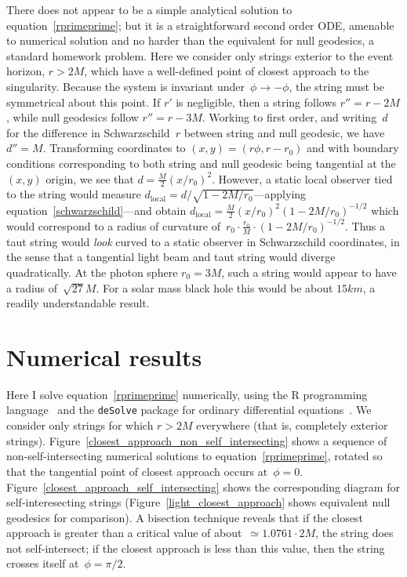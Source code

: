 \documentclass{ws-tpe}
\begin{document}
There does not appear to be a simple analytical solution to
equation~\ref{rprimeprime}; but it is a straightforward second order
ODE, amenable to numerical solution and no harder than the equivalent
for null geodesics, a standard homework problem.  Here we consider
only strings exterior to the event horizon, $r>2M$, which have a
well-defined point of closest approach to the singularity.  Because
the system is invariant under~$\phi\longrightarrow-\phi$, the string
must be symmetrical about this point.  If $r'$ is negligible, then a string
follows $r''=r-2M$, while null geodesics follow $r''=r-3M$.
Working to first order, and writing~$d$ for the difference in
Schwarzschild~$r$ between string and null geodesic, we have $d''=M$.
Transforming coordinates to $(x,y) = (r\phi,r-r_0)$ and with boundary
conditions corresponding to both string and null geodesic being
tangential at the $(x,y)$ origin, we see that
$d=\frac{M}{2}(x/r_0)^2$.  However, a static local observer tied to
the string would measure
$d_\mathrm{local}=d/\sqrt{1-2M/r_0}$---applying
equation~\ref{schwarzschild}---and obtain
$d_\mathrm{local}=\frac{M}{2}(x/r_0)^2\left(1-2M/r_0\right)^{-1/2}$
which would correspond to a radius of curvature
of~$r_0\cdot\frac{r_0}{M}\cdot\left(1-2M/r_0\right)^{-1/2}$.  Thus a
taut string would {\em look} curved to a static observer in
Schwarzschild coordinates, in the sense that a tangential light beam
and taut string would diverge quadratically.  At the photon sphere
$r_0=3M$, such a string would appear to have a radius of~$\sqrt{27}M$.
For a solar mass black hole this would be about $15\unit{km}$, a
readily understandable result.


\section{Numerical results}

Here I solve equation~\ref{rprimeprime} numerically, using the R
programming language~\cite{rcore2019} and the \verb+deSolve+ package
for ordinary differential equations~\cite{soetart2010}.  We consider
only strings for which $r>2M$ everywhere (that is, completely exterior
strings).  Figure~\ref{closest_approach_non_self_intersecting} shows a
sequence of non-self-intersecting numerical solutions to
equation~\ref{rprimeprime}, rotated so that the tangential point of
closest approach occurs at~$\phi=0$.
Figure~\ref{closest_approach_self_intersecting} shows the
corresponding diagram for self-interesecting strings
(Figure~\ref{light_closest_approach} shows equivalent null geodesics
for comparison).  A bisection technique reveals that if the closest
approach is greater than a critical value of about~$\simeq 1.0761\cdot
2M$, the string does not self-intersect; if the closest approach is
less than this value, then the string crosses itself at~$\phi=\pi/2$.
\end{document}
